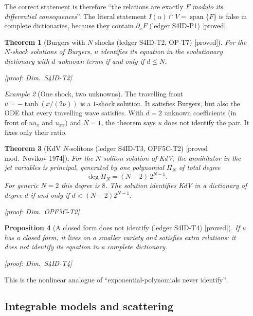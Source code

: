 \documentclass[11pt]{article}
\theoremstyle{plain}
\newtheorem{theorem}{Theorem}[section]
\newtheorem{proposition}[theorem]{Proposition}
\theoremstyle{definition}
\theoremstyle{remark}
\newtheorem{example}[theorem]{Example}
\DeclareMathOperator{\spn}{span}
\newcommand{\badge}[2]{\textcolor{#1}{\textsf{\footnotesize[#2]}}}
\newcommand{\proved}[1][]{\badge{cC}{proved#1}}
\newcommand{\modulo}[1]{\badge{cD}{proved mod.\ #1}}
\newcommand{\led}[1]{\textcolor{cG}{\textsf{\footnotesize(ledger #1)}}}
\newcommand{\dimref}[1]{\textsf{\footnotesize[proof: Dim.~#1]}}
\begin{document}
The correct statement is therefore ``the relations are exactly $F$ \emph{modulo its differential consequences}''. The literal statement $I(u)\cap V=\spn\{F\}$ is false in complete dictionaries, because they contain $\partial_xF$ \led{S4ID-P1} \proved.

\begin{theorem}[{Burgers with $N$ shocks \led{S4ID-T2, OP-T7} \proved}]\label{thm:burgersN}
For the $N$-shock solutions of Burgers, $u$ identifies its equation in the evolutionary dictionary with $d$ unknown terms if and only if $d\le N$.

\dimref{S4ID-T2}
\end{theorem}

\begin{example}[{One shock, two unknowns}]
The travelling front $u=-\tanh(x/(2\nu))$ is a $1$-shock solution. It satisfies Burgers, but also the ODE that every travelling wave satisfies. With $d=2$ unknown coefficients (in front of $uu_x$ and $u_{xx}$) and $N=1$, the theorem says $u$ does not identify the pair. It fixes only their ratio.
\end{example}

\begin{theorem}[{KdV $N$-solitons \led{S4ID-T3, OPF5C-T2} \modulo{Novikov 1974}}]\label{thm:kdv}
For the $N$-soliton solution of KdV, the annihilator in the jet variables is principal, generated by one polynomial $\Pi_N$ of total degree
\[
\deg\Pi_N=(N+2)\,2^{N-1}.
\]
For generic $N=2$ this degree is $8$. The solution identifies KdV in a dictionary of degree $d$ if and only if $d<(N+2)2^{N-1}$.

\dimref{OPF5C-T2}
\end{theorem}

\begin{proposition}[{A closed form does not identify \led{S4ID-T4} \proved}]
If $u$ has a closed form, it lives on a smaller variety and satisfies extra relations: it does not identify its equation in a complete dictionary.

\dimref{S4ID-T4}
\end{proposition}

This is the nonlinear analogue of ``exponential-polynomials never identify''.

\subsection{Integrable models and scattering}
\end{document}
